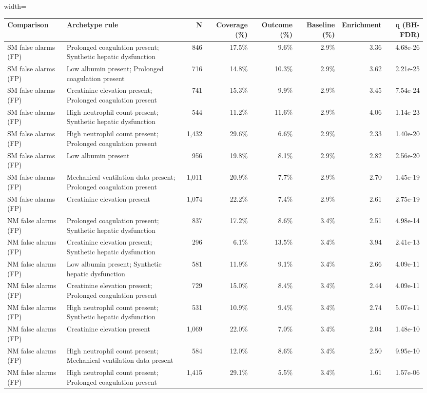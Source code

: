\documentclass[border=0pt]{standalone}
\begin{document}
\begin{adjustbox}{width=\textwidth}
\begin{tabular}{@{}llrrrrrr@{}}
\toprule
Comparison & Archetype rule & N & Coverage (\%) & Outcome (\%) & Baseline (\%) & Enrichment & q (BH-FDR) \\
\midrule
SM false alarms (FP) & Prolonged coagulation present; Synthetic hepatic dysfunction & 846 & 17.5\% & 9.6\% & 2.9\% & 3.36 & 4.68e-26 \\
SM false alarms (FP) & Low albumin present; Prolonged coagulation present & 716 & 14.8\% & 10.3\% & 2.9\% & 3.62 & 2.21e-25 \\
SM false alarms (FP) & Creatinine elevation present; Prolonged coagulation present & 741 & 15.3\% & 9.9\% & 2.9\% & 3.45 & 7.54e-24 \\
SM false alarms (FP) & High neutrophil count present; Synthetic hepatic dysfunction & 544 & 11.2\% & 11.6\% & 2.9\% & 4.06 & 1.14e-23 \\
SM false alarms (FP) & High neutrophil count present; Prolonged coagulation present & 1,432 & 29.6\% & 6.6\% & 2.9\% & 2.33 & 1.40e-20 \\
SM false alarms (FP) & Low albumin present & 956 & 19.8\% & 8.1\% & 2.9\% & 2.82 & 2.56e-20 \\
SM false alarms (FP) & Mechanical ventilation data present; Prolonged coagulation present & 1,011 & 20.9\% & 7.7\% & 2.9\% & 2.70 & 1.45e-19 \\
SM false alarms (FP) & Creatinine elevation present & 1,074 & 22.2\% & 7.4\% & 2.9\% & 2.61 & 2.75e-19 \\
NM false alarms (FP) & Prolonged coagulation present; Synthetic hepatic dysfunction & 837 & 17.2\% & 8.6\% & 3.4\% & 2.51 & 4.98e-14 \\
NM false alarms (FP) & Creatinine elevation present; Synthetic hepatic dysfunction & 296 & 6.1\% & 13.5\% & 3.4\% & 3.94 & 2.41e-13 \\
NM false alarms (FP) & Low albumin present; Synthetic hepatic dysfunction & 581 & 11.9\% & 9.1\% & 3.4\% & 2.66 & 4.09e-11 \\
NM false alarms (FP) & Creatinine elevation present; Prolonged coagulation present & 729 & 15.0\% & 8.4\% & 3.4\% & 2.44 & 4.09e-11 \\
NM false alarms (FP) & High neutrophil count present; Synthetic hepatic dysfunction & 531 & 10.9\% & 9.4\% & 3.4\% & 2.74 & 5.07e-11 \\
NM false alarms (FP) & Creatinine elevation present & 1,069 & 22.0\% & 7.0\% & 3.4\% & 2.04 & 1.48e-10 \\
NM false alarms (FP) & High neutrophil count present; Mechanical ventilation data present & 584 & 12.0\% & 8.6\% & 3.4\% & 2.50 & 9.95e-10 \\
NM false alarms (FP) & High neutrophil count present; Prolonged coagulation present & 1,415 & 29.1\% & 5.5\% & 3.4\% & 1.61 & 1.57e-06 \\
\bottomrule
\end{tabular}
\end{adjustbox}
\end{document}

